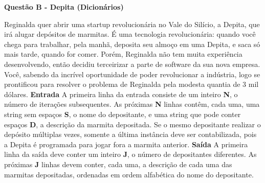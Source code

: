 \documentclass[a4paper, 12pt]{article}
\begin{document}
\newpage %
\begin{center}
\textbf{{\Large Questão B - Depita (Dicionários)}} 
\end{center} 
	\vspace{5pt} 
	Reginalda quer abrir uma startup revolucionária no Vale do Silício, a Depita, que irá
	alugar depósitos de marmitas. É uma tecnologia revolucionária: quando você
	chega para trabalhar, pela manhã, deposita seu almoço em uma Depita\textbf{\texttrademark}, e saca
	só mais tarde, quando for comer. \newline \newline
	Porém, Reginalda não tem muita experiência desenvolvendo, então decidiu
	terceirizar a parte de software da sua nova empresa. Você, sabendo da incrível
	oportunidade de poder revolucionar a indústria, logo se prontificou para resolver o
	problema de Reginalda pela modesta quantia de 3 mil dólares.
	\newline \newline
	\textbf{{\large Entrada}} \newline
	A primeira linha da entrada consiste de um inteiro \textbf{N}, o número de iterações
	subsequentes. As próximas \textbf{N} linhas contêm, cada uma, uma string sem espaços
	\textbf{S}, o nome do depositante, e uma string que pode conter espaços \textbf{D}, a descrição da
	marmita depositada. \newline \newline
	Se o mesmo depositante realizar o depósito múltiplas vezes, somente a última
	instância deve ser contabilizada, pois a Depita\textbf{\texttrademark} é programada para jogar fora a
	marmita anterior.
	\newline \newline
	\textbf{{\large Saída}} \newline
	A primeira linha da saída deve conter um inteiro \textbf{J}, o número de depositantes
	diferentes. As próximas \textbf{J} linhas devem conter, cada uma, a descrição de cada uma das
	marmitas depositadas, ordenadas em ordem alfabética do nome do depositante.
	\newline
\end{document}
